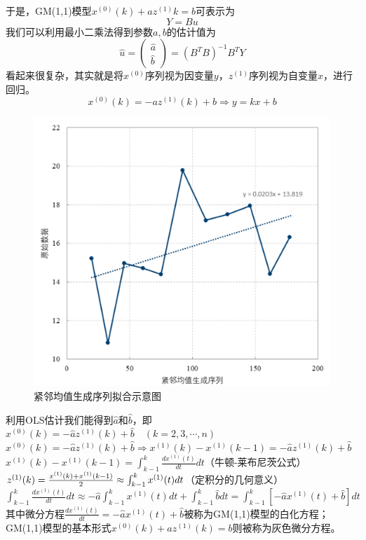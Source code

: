 \documentclass[openany]{progbookcn}
\begin{document}
\indent 于是，GM(1,1)模型$x^{(0)}(k)+az^{(1)}{k}=b$可表示为
\begin{equation}\nonumber
Y=Bu
\end{equation}
\indent 我们可以利用最小二乘法得到参数$a,b$的估计值为
\begin{equation}
\hat u = \left( {\begin{array}{*{20}{c}}
{\hat a}\\
{\hat b}
\end{array}} \right) = {\left( {{B^T}B} \right)^{ - 1}}{B^T}Y
\end{equation}
\indent 看起来很复杂，其实就是将$x^{(0)}$序列视为因变量$y$，$z^{(1)}$序列视为自变量$x$，进行回归。
\begin{equation}
x^{(0)}(k)=-az^{(1)}(k)+b\Rightarrow y=kx+b
\end{equation}
\begin{figure}[H]
\centering
\includegraphics[width=0.45 \textwidth]{figs/chapter8/紧邻均值生成序列拟合}
\caption{紧邻均值生成序列拟合示意图}
\end{figure}
\indent 利用OLS估计我们能得到${\hat a}$和${\hat b}$，即$x^{(0)}(k)=-{\hat a}z^{(1)}(k)+{\hat b}\quad (k=2,3,\cdots,n)$\\
\indent $x^{(0)}(k)=-{\hat a}z^{(1)}(k)+{\hat b}\Rightarrow x^{(1)}(k)-x^{(1)}(k-1)=-{\hat a}z^{(1)}(k)+{\hat b}$\\
\indent $x^{(1)}(k)-x^{(1)}(k-1)=\int_{k - 1}^k {\frac{{d{x^{(1)}}(t)}}{{dt}}dt} $（牛顿-莱布尼茨公式）\\ 
\indent $z^{(1)}(k)={{x^{(1)}(k)+x^{(1)}(k-1)}\over{2}}\approx \int_{k - 1}^k {{x^{(1)}}(t)dt} $（定积分的几何意义）\\
\indent $\int_{k - 1}^k {\frac{{d{x^{(1)}}(t)}}{{dt}}dt}  \approx  - \hat a\int_{k - 1}^k {{x^{(1)}}(t)dt + \int_{k - 1}^k {\hat bdt = \int_{k - 1}^k {[ - \hat a{x^{(1)}}(t) + \hat b]dt} } } $\\
\indent 其中微分方程$\frac{{d{x^{(1)}}(t)}}{{dt}} =  - \hat a{x^{(1)}}(t) + \hat b$被称为GM(1,1)模型的白化方程；GM(1,1)模型的基本形式$x^{(0)}(k)+az^{(1)}(k)=b$则被称为灰色微分方程。\\
\end{document}
